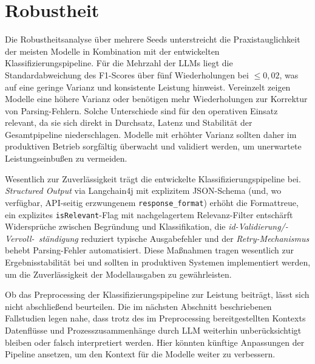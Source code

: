 \section{Robustheit}\label{sec:robustheit2}

Die Robustheitsanalyse über mehrere Seeds unterstreicht die Praxistauglichkeit der meisten Modelle in Kombination mit der entwickelten Klassifizierungspipeline. Für die Mehrzahl der \acp{LLM} liegt die Standardabweichung des F1-Scores über fünf Wiederholungen bei $\leq 0{,}02$, was auf eine geringe Varianz und konsistente Leistung hinweist. Vereinzelt zeigen Modelle eine höhere Varianz oder benötigen mehr Wiederholungen zur Korrektur von Parsing-Fehlern. Solche Unterschiede sind für den operativen Einsatz relevant, da sie sich direkt in Durchsatz, Latenz und Stabilität der Gesamtpipeline niederschlagen. Modelle mit erhöhter Varianz sollten daher im produktiven Betrieb sorgfältig überwacht und validiert werden, um unerwartete Leistungseinbußen zu vermeiden.

Wesentlich zur Zuverlässigkeit trägt die entwickelte Klassifizierungspipeline bei. \emph{Structured Output} via Langchain4j mit explizitem JSON-Schema (und, wo verfügbar, API-seitig erzwungenem \texttt{response\_format}) erhöht die Formattreue, ein explizites \texttt{isRelevant}-Flag mit nachgelagertem Relevanz-Filter entschärft Widersprüche zwischen Begründung und Klassifikation, die \emph{id-Validierung/-Vervoll-\linebreak~ständigung} reduziert typische Ausgabefehler und der \emph{Retry-Mechanismus} behebt Parsing-Fehler automatisiert. Diese Maßnahmen tragen wesentlich zur Ergebnisstabilität bei und sollten in produktiven Systemen implementiert werden, um die Zuverlässigkeit der Modellausgaben zu gewährleisten.

Ob das Preprocessing der Klassifizierungspipeline zur Leistung beiträgt, lässt sich nicht abschließend beurteilen. Die im nächsten Abschnitt beschriebenen Fallstudien legen nahe, dass trotz des im Preprocessing bereitgestellten Kontexts Datenflüsse und Prozesszusammenhänge durch \ac{LLM} weiterhin unberücksichtigt bleiben oder falsch interpretiert werden. Hier könnten künftige Anpassungen der Pipeline ansetzen, um den Kontext für die Modelle weiter zu verbessern.